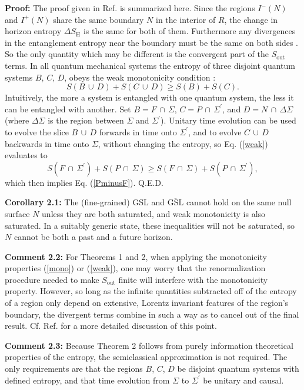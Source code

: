 \documentclass[12pt]{article}
\begin{document}
\textbf{Proof:} The proof given in Ref. \cite{anec} is summarized here.  Since the regions $I^-(N)$ and $I^+(N)$ share the same boundary $N$ in the interior of $R$, the change in horizon entropy $\Delta S_\mathrm{H}$ is the same for both of them.  Furthermore any divergences in the entanglement entropy near the boundary must be the same on both sides \cite{anec}.  So the only quantity which may be different is the convergent part of the $S_\mathrm{out}$ terms.  In all quantum mechanical systems the entropy of three disjoint quantum systems $B$, $C$, $D$, obeys the weak monotonicity condition \cite{weakmono}:
\begin{equation}\label{weak}
S(B\,\cup\,D) + S(C\,\cup\,D) \ge S(B) + S(C).
\end{equation}
Intuitively, the more a system is entangled with one quantum system, the less it can be entangled with another.  Set $B = F\,\cap\,\Sigma$, $C = P\,\cap\,\Sigma^\prime$, and 
$D = N\,\cap\,\Delta \Sigma$ (where $\Delta \Sigma$ is the region between $\Sigma$ and $\Sigma^\prime$).  Unitary time evolution can be used to evolve the slice $B\,\cup\,D$ forwards in time onto $\Sigma^\prime$, and to evolve $C\,\cup\,D$ backwards in time onto $\Sigma$, without changing the entropy, so Eq. (\ref{weak}) evaluates to
\begin{equation}
S(F\,\cap\,\Sigma^\prime) + S(P\,\cap\,\Sigma) \ge S(F\,\cap\,\Sigma) + S(P\,\cap\,\Sigma^\prime),
\end{equation}
which then implies Eq. (\ref{PminusF}). Q.E.D.

\textbf{Corollary 2.1:} The (fine-grained) GSL and $\overline{\mathrm{GSL}}$ cannot hold on the same null surface $N$ unless they are both saturated, and weak monotonicity is also saturated.  In a suitably generic state, these inequalities will not be saturated, so $N$ cannot be both a past and a future horizon.

\textbf{Comment 2.2:} For Theorems 1 and 2, when applying the monotonicity properties (\ref{mono}) or (\ref{weak}), one may worry that the renormalization procedure needed to make $S_\mathrm{out}$ finite will interfere with the monotonicity property.  However, so long as the  infinite quantities subtracted off of the entropy of a region only depend on extensive, Lorentz invariant features of the region's boundary, the divergent terms combine in such a way as to cancel out of the final result.  Cf. Ref. \cite{anec} for a more detailed discussion of this point.

\textbf{Comment 2.3:} Because Theorem 2 follows from purely information theoretical properties of the entropy, the semiclassical approximation is not required.  The only requirements are that the regions $B$, $C$, $D$ be disjoint quantum systems with defined entropy, and that time evolution from $\Sigma$ to $\Sigma^\prime$ be unitary and causal.
\end{document}
